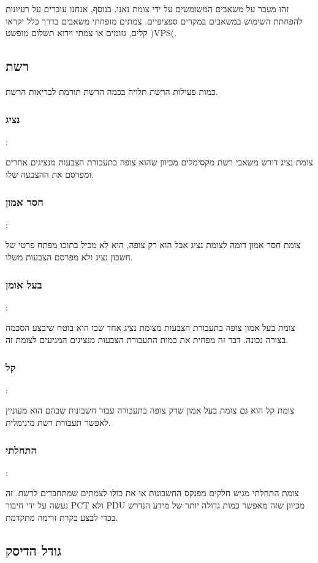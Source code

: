 זהו מעבר על משאבים המשומשים על ידי צומת נאנו. בנוסף, אנחנו עוברים על רעיונות להפחתת השימוש במשאבים במקרים ספציפיים. צמתים מופחתי משאבים בדרך כלל יקראו קלים, גזומים או צמתי וידוא תשלום מופשט
)VPS(.


\subsection{רשת}

כמות פעילות הרשת תלויה בכמה הרשת תורמת לבריאות הרשת.

\subsubsection{נציג}:


צומת נציג דורש משאבי רשת מקסימלים מכיוון שהוא צופה בתעבורת הצבעות מנציגים אחרים ומפרסם את ההצבעה שלו.

\subsubsection{חסר אמון}:

צומת חסר אמון דומה לצומת נציג אבל הוא רק צופה, הוא לא מכיל בתוכו מפתח פרטי של חשבון נציג ולא מפרסם הצבעות משלו.


\subsubsection{בעל אומן}:

צומת בעל אמון צופה בתעבורת הצבעות מצומת נציג אחד שבו הוא בוטח שיבצע הסכמה בצורה נכונה. דבר זה מפחית את כמות התעבורת הצבעות מנציגים המגיעים לצומת זה.

\subsubsection{קל}:

צומת קל הוא גם צומת בעל אמון שרק צופה בתעבורה עבור חשבונות שבהם הוא מעוניין לאפשר תעבורת רשת מינימלית.

\subsubsection{התחלתי}:

צומת התחלתי מגיש חלקים מפנקס החשבונות או את כולו לצמתים שמתחברים לרשת.
זה נעשה על ידי חיבור 
PCT
ולא
PDU
מכיוון שזה מאפשר כמות גדולה יותר של מידע הנדרש בכדי לבצע בקרת זרימה מתקדמת.

\subsection{גודל הדיסק}

